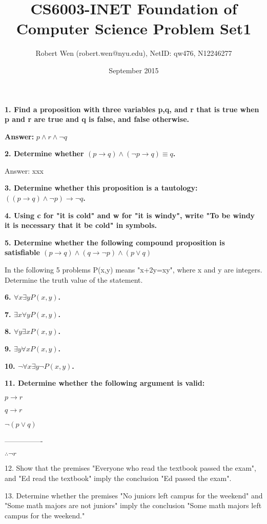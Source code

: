 \documentclass{article}
\title{CS6003-INET Foundation of Computer Science Problem Set1}
\author{Robert Wen (robert.wen@nyu.edu), NetID: qw476, N12246277}
\date{September 2015}
\begin{document}
\maketitle
\setlength{\parindent}{2ex}
\textbf{1. Find a proposition with three variables p,q, and r that is true when p and r are true and q is false, and false otherwise.}

\textbf{Answer:} $p \land r \land \lnot q$
\newline

\textbf{2. Determine whether $(p \to q) \land (\lnot p \to q) \equiv q$.}

Answer: xxx
\newline

\textbf{3. Determine whether this proposition is a tautology: $((p \to q) \land \lnot p) \to \lnot q$.}

\textbf{4. Using c for "it is cold" and w for "it is windy", write "To be windy it is necessary that it be cold" in symbols.}

\textbf{5. Determine whether the following compound proposition is satisfiable $(p \to q) \land (q \to \lnot p)\land (p \lor q)$}

In the following 5 problems P(x,y) means "x+2y=xy", where x and y are integers. Determine the truth value of the statement.

\textbf{6. $\forall x \exists yP(x,y)$.}

\textbf{7. $\exists x \forall yP(x,y)$.}

\textbf{8. $\forall y \exists xP(x,y)$.}

\textbf{9. $\exists y \forall xP(x,y)$.}

\textbf{10. $\lnot \forall x \exists y \lnot P(x,y)$.}

\textbf{11. Determine whether the following argument is valid:}

\textbf{$p \to r$}

\textbf{$q \to r$}

\textbf{$\lnot (p \lor q)$}

----------------

$\therefore \lnot r$

12. Show that the premises "Everyone who read the textbook passed the exam", and "Ed read the textbook" imply the conclusion "Ed passed the exam".

13. Determine whether the premises "No juniors left campus for the weekend" and "Some math majors are not juniors" imply the conclusion "Some math majors left campus for the weekend."
\end{document}
